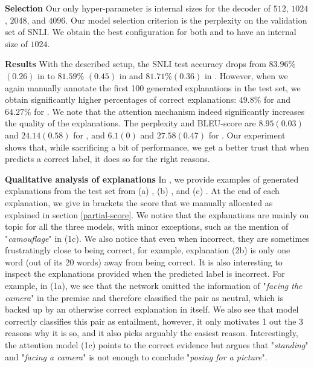\textbf{Selection   } Our only hyper-parameter is internal sizes for the decoder of $512$, $1024$, $2048$, and $4096$. Our model selection criterion is the perplexity on the validation set of SNLI. We obtain the best configuration for both \exptwoseqtoseq{} and \exptwoattention{} to have an internal size of $1024$. 


\textbf{Results   } With the described setup, the SNLI test accuracy drops from $83.96\%$ $(0.26)$ in \expone{} to $81.59\%$ $(0.45)$ in \exptwoseqtoseq{} and $81.71\% (0.36)$ in \exptwoattention. 
However, when we again manually annotate the first 100 generated explanations in the test set, we obtain significantly higher percentages of correct explanations: $49.8\%$ for \exptwoseqtoseq{} and $64.27\%$ for \exptwoattention. We note that the attention mechanism indeed significantly increases the quality of the explanations. The perplexity and BLEU-score are $8.95 (0.03)$ and $24.14 (0.58)$ for \exptwoseqtoseq{}, and $6.1 (0)$ and $27.58 (0.47)$  for \exptwoattention. Our experiment shows that, while sacrificing a bit of performance, we get a better trust that when \exptwo{} predicts a correct label, it does so for the right reasons.


\textbf{Qualitative analysis of explanations   } In , we provide examples of generated explanations from the test set from (a) \expone, (b) \exptwoseqtoseq{}, and (c) \exptwoattention. At the end of each explanation, we give in brackets the score that we manually allocated as explained in section \ref{partial-score}. We notice that the explanations are mainly on topic for all the three models, with minor exceptions, such as the mention of "\textit{camouflage}" in (1c). We also notice that even when incorrect, they are sometimes frustratingly close to being correct, for example, explanation (2b) is only one word (out of its 20 words) away from being correct. It is also interesting to inspect the explanations provided when the predicted label is incorrect. For example, in (1a), we see that the network omitted the information of "\textit{facing the camera}" in the premise and therefore classified the pair as neutral, which is backed up by an otherwise correct explanation in itself. We also see that model \exptwoseqtoseq{} correctly classifies this pair as entailment, however, it only motivates 1 out the 3 reasons why it is so, and it also picks arguably the easiest reason. Interestingly, the attention model (1c) points to the correct evidence but argues that "\textit{standing}" and "\textit{facing a camera}" is not enough to conclude "\textit{posing for a picture}". 




